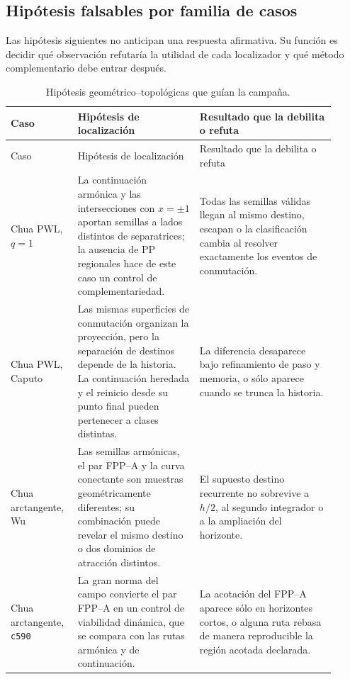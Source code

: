 \subsection{Hipótesis falsables por familia de casos}
\label{camp:hipotesis-casos}

Las hipótesis siguientes no anticipan una respuesta afirmativa. Su función es
decidir qué observación refutaría la utilidad de cada localizador y qué método
complementario debe entrar después.

\begin{longtable}{@{}p{0.17\linewidth}p{0.35\linewidth}p{0.39\linewidth}@{}}
\caption{Hipótesis geométrico--topológicas que guían la campaña.}
\label{camp:tab-hypotheses}\\
\toprule
Caso & Hipótesis de localización & Resultado que la debilita o refuta\\
\midrule
\endfirsthead
\toprule
Caso & Hipótesis de localización & Resultado que la debilita o refuta\\
\midrule
\endhead
Chua PWL, \(q=1\)
& La continuación armónica y las intersecciones con \(x=\pm1\) aportan semillas
  a lados distintos de separatrices; la ausencia de PP regionales hace de este
  caso un control de complementariedad.
& Todas las semillas válidas llegan al mismo destino, escapan o la clasificación
  cambia al resolver exactamente los eventos de conmutación.\\

Chua PWL, Caputo
& Las mismas superficies de conmutación organizan la proyección, pero la
  separación de destinos depende de la historia. La continuación heredada y
  el reinicio desde su punto final pueden pertenecer a clases distintas.
& La diferencia desaparece bajo refinamiento de paso y memoria, o sólo aparece
  cuando se trunca la historia.\\

Chua arctangente, Wu
& Las semillas armónicas, el par FPP--A y la curva conectante son muestras
  geométricamente diferentes; su combinación puede revelar el mismo destino o
  dos dominios de atracción distintos.
& El supuesto destino recurrente no sobrevive a \(h/2\), al segundo integrador
  o a la ampliación del horizonte.\\

Chua arctangente, \texttt{c590}
& La gran norma del campo convierte el par FPP--A en un control de viabilidad
  dinámica, que se compara con las rutas armónica y de continuación.
& La acotación del FPP--A aparece sólo en horizontes cortos, o alguna ruta
  rebasa de manera reproducible la región acotada declarada.\\


\end{longtable}
